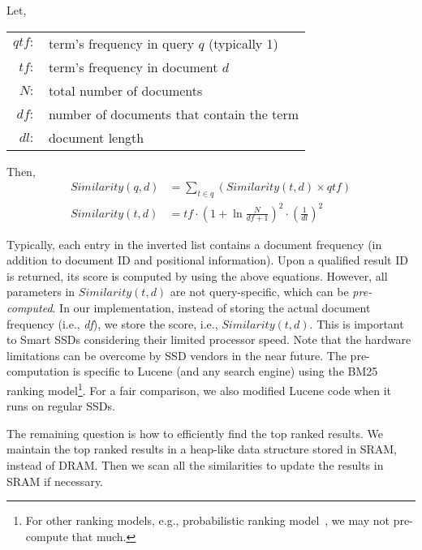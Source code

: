 \noindent Let,

\begin{tabular}{rl}
$qtf:$& term's frequency in query $q$ (typically 1)\\
$tf:$ & term's frequency in document $d$\\
$N:$ & total number of documents\\
$df:$ & number of documents that contain the term\\
$dl:$ & document length\\
\end{tabular}

\noindent Then,
\begin{displaymath}
  \begin{aligned}
    Similarity(q,d)&=\sum_{t\in q}(Similarity(t,d) \times qtf)\\
    Similarity(t,d)&=tf\cdot(1+\ln\frac{N}{df + 1})^2\cdot(\frac{1}{dl})^2
  \end{aligned}
\end{displaymath}

Typically, each entry in the inverted list contains a document frequency (in addition to document ID and positional information).
Upon a qualified result ID is returned, its score is computed by using the above equations. However, all parameters in $Similarity(t,d)$ are not query-specific, which can be \emph{pre-computed}. In our implementation, instead of storing the actual document frequency (i.e., \emph{df}), we store the score, i.e., $Similarity(t,d)$. This is important to Smart SSDs considering their limited processor speed. Note that the hardware limitations can be overcome by SSD vendors in the near future. The pre-computation is specific to  Lucene (and any search engine) using the BM25 ranking model\footnote{\small For other ranking models, e.g., probabilistic ranking model~\cite{M08}, we may not pre-compute that much.}.
For a fair comparison, we also modified Lucene code when it runs on regular SSDs.

The remaining question is how to efficiently find the top ranked results. We maintain the top ranked results in a heap-like data structure stored in SRAM, instead of DRAM. Then we scan all the similarities to update the results in SRAM if necessary. 